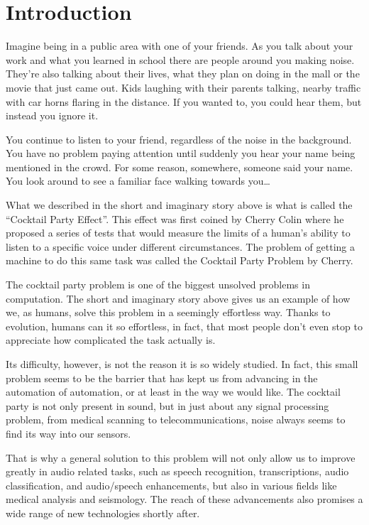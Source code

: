 \documentclass{book}
\begin{document}
\chapter{Introduction}

\qquad Imagine being in a public area with one of your friends. As you talk about your work and what you learned in school there are people around you making noise. They’re also talking about their lives, what they plan on doing in the mall or the movie that just came out. Kids laughing with their parents talking, nearby traffic with car horns flaring in the distance. If you wanted to, you could hear them, but instead you ignore it.
\par
You continue to listen to your friend, regardless of the noise in the background. You have no problem paying attention until suddenly you hear your name being mentioned in the crowd. For some reason, somewhere, someone said your name. You look around to see a familiar face walking towards you…
\par
What we described in the short and imaginary story above is what is called the “Cocktail Party Effect”. This effect was first coined by Cherry Colin\cite{Cherry} where he proposed a series of tests that would measure the limits of a human’s ability to listen to a specific voice under different circumstances. The problem of getting a machine to do this same task was called the Cocktail Party Problem by Cherry.
\par
The cocktail party problem is one of the biggest unsolved problems in computation. The short and imaginary story above gives us an example of how we, as humans, solve this problem in a seemingly effortless way. Thanks to evolution, humans can it so effortless, in fact, that most people don’t even stop to appreciate how complicated the task actually is.
\par
Its difficulty, however, is not the reason it is so widely studied. In fact, this small problem seems to be the barrier that has kept us from advancing in the automation of automation, or at least in the way we would like. The cocktail party is not only present in sound, but in just about any signal processing problem, from medical scanning to telecommunications\cite{CocktailPartyProblemRevisit}, noise always seems to find its way into our sensors.
\par
That is why a general solution to this problem will not only allow us to improve greatly in audio related tasks, such as speech recognition, transcriptions, audio classification, and audio/speech enhancements, but also in various fields like medical analysis and seismology. The reach of these advancements also promises a wide range of new technologies shortly after.
\end{document}
